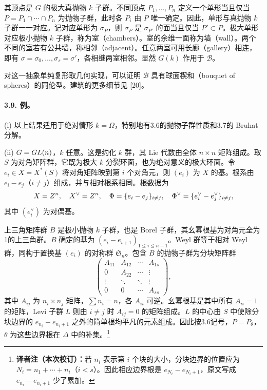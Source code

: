 其顶点是 $G$ 的极大真抛物 $k$ 子群。不同顶点 $P_1,\ldots,P_n$ 定义一个单形当且仅当 $P=P_1\cap\cdots\cap P_n$ 为抛物子群，此时各 $P_i$ 由 $P$ 唯一确定。因此，单形与真抛物 $k$ 子群一一对应。记对应单形为 $\sigma_P$，则 $\sigma_P$ 是 $\sigma_{P'}$ 的面当且仅当 $P'\subset P$。极大单形对应极小抛物 $k$ 子群，称为室（chambers）。室的余维一面称为墙（wall）。两个不同的室若有公共墙，称相邻（adjacent）。任意两室可用长廊（gallery）相连，即有 $\sigma=\sigma_0,\ldots,\sigma_s=\sigma'$，各相继两室相邻。显然 $G(k)$ 作用于 $\mathcal B$。

对这一抽象单纯复形取几何实现，可以证明 $\mathcal B$ 具有球面楔和（bouquet of spheres）的同伦型。建筑的更多细节见 [20]。
\paragraph*{3.9. 例。} (i) 以上结果适用于绝对情形 $k=\Omega$，特别地有3.6的抛物子群性质和3.7的 Bruhat 分解。

(ii) $G=GL(n)$，$k$ 任意。这是约化 $k$ 群，其 Lie 代数由全体 $n\times n$ 矩阵组成。取 $S$ 为对角矩阵群，它既为极大 $k$ 分裂环面，也为绝对意义的极大环面。令 $e_i\in X=X^*(S)$ 将对角矩阵映到第 $i$ 个对角元，则 $(e_i)$ 为 $X$ 的基。根系由 $e_i-e_j$（$i\ne j$）组成，并与相对根系相同。根数据为
\[
 X=Z^n,\quad X^\vee=Z^n,\quad
 \Phi=\{e_i-e_j\}_{i\ne j},\quad
 \Phi^\vee=\{e_i^\vee-e_j^\vee\}_{i\ne j},
\]
其中 $(e_i^\vee)$ 为对偶基。

上三角矩阵群 $B$ 是极小抛物 $k$ 子群，也是 Borel 子群，其幺幂根基为对角元全为1的上三角群。$B$ 确定的基为 $(e_i-e_{i+1})_{1\le i\le n-1}$。Weyl 群等于相对 Weyl 群，同构于置换基 $(e_i)$ 的对称群 $\mathfrak S_n$。包含 $B$ 的抛物子群为分块矩阵群
\[
 \begin{pmatrix}
 A_{11}&A_{12}&\cdots&A_{1s}\\
 0&A_{22}&\cdots&\vdots\\
 \vdots&\ddots&\ddots&\vdots\\
 0&0&\cdots&A_{ss}
 \end{pmatrix},
\]
其中 $A_{ij}$ 为 $n_i\times n_j$ 矩阵，$\sum n_i=n$，各 $A_{ii}$ 可逆。幺幂根基是其中所有 $A_{ii}=1$ 的矩阵，Levi 子群 $L$ 则由 $i\ne j$ 时 $A_{ij}=0$ 的矩阵组成。$L$ 的中心由 $S$ 中使除分块边界的 $e_{n_i}-e_{n_i+1}$ 之外的简单根均平凡的元素组成。因此按3.6记号，$P=P_\theta$，$\theta$ 为这些边界根在 $\Delta$ 中的补集。\footnote{\textbf{译者注（本次校订）：}若 $n_i$ 表示第 $i$ 个块的大小，分块边界的位置应为 $N_i=n_1+\cdots+n_i$（$i<s$）。因此相应边界根是 $e_{N_i}-e_{N_i+1}$，原文写成 $e_{n_i}-e_{n_i+1}$ 少了累加。}

